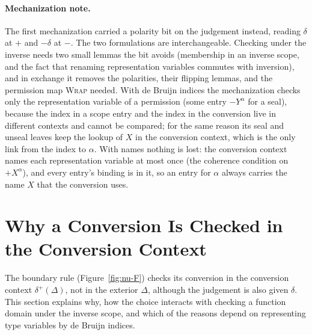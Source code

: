 \documentclass[acmsmall,screen,review,anonymous,nonacm]{acmart}
\newcommand{\dual}[1]{-#1}
\begin{document}
\paragraph{Mechanization note.}  The first mechanization carried a
polarity bit on the judgement instead, reading $\delta$ at $+$ and
$\dual{\delta}$ at $-$.  The two formulations are interchangeable.
Checking under the inverse needs two small lemmas the bit avoids
(membership in an inverse scope, and the fact that renaming
representation variables commutes with inversion), and in exchange
it removes the polarities, their flipping lemmas, and the permission
map \textsc{Wrap} needed.  With de Bruijn indices the mechanization
checks only the representation variable of a permission (some entry
${-Y}^\alpha$ for a seal), because the index in a scope entry and the
index in the conversion live in different contexts and cannot be
compared; for the same reason its seal and unseal leaves keep the
lookup of $X$ in the conversion context, which is the only link from
the index to $\alpha$.  With names nothing is lost: the conversion
context names each representation variable at most once (the coherence
condition on ${+X}^\alpha$), and every entry's binding is in it, so an
entry for $\alpha$ always carries the name $X$ that the conversion
uses.

\section{Why a Conversion Is Checked in the Conversion Context}
\label{sec:conversion-context}

The boundary rule (Figure~\ref{fig:nu-F}) checks its conversion in the
conversion context $\delta^{+}(\Delta)$, not in the exterior $\Delta$,
although the judgement is also given $\delta$.  This section explains
why, how the choice interacts with checking a function domain under
the inverse scope, and which of the reasons depend on representing
type variables by de Bruijn indices.
\end{document}
